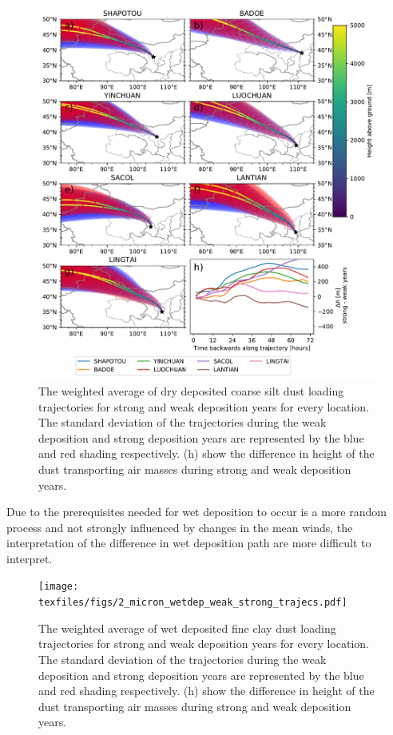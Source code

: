 \begin{figure}[htbp]
    \centering
    \includegraphics[width=\textwidth]{texfiles/figs/20_micron_drydep_weak_strong_trajecs.pdf}
    \caption{The weighted average of dry deposited coarse silt dust loading trajectories for strong and weak deposition years for every location. The standard deviation of the trajectories during the weak deposition and strong deposition years are represented by the blue and red shading respectively.  (h) show the difference in height of the dust transporting air masses during strong and weak deposition years. }
    \label{fig:strong_weak_drydepo_year_20mmu_trajecs}
\end{figure}

Due to the prerequisites needed for wet deposition to occur is a more random process and not strongly influenced by changes in the mean winds, the interpretation of the difference in wet deposition path are more difficult to interpret. 
\begin{figure}[htbp]
    \centering
    \texttt{[image: texfiles/figs/2\_micron\_wetdep\_weak\_strong\_trajecs.pdf]}
    \caption{The weighted average of wet deposited fine clay dust loading trajectories for strong and weak deposition years for every location. The standard deviation of the trajectories during the weak deposition and strong deposition years are represented by the blue and red shading respectively.  (h) show the difference in height of the dust transporting air masses during strong and weak deposition years. }
    \label{fig:strong_weak_wetdepo_year_2mmu_trajecs}
\end{figure}

